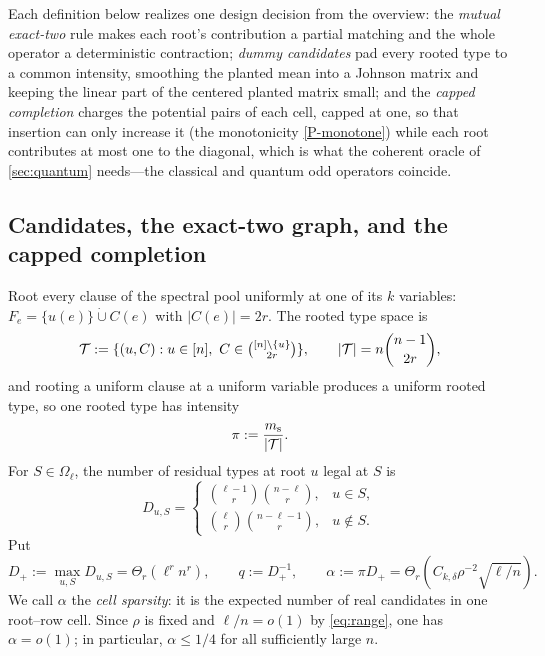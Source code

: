 \documentclass[11pt]{article}
\theoremstyle{definition}
\theoremstyle{remark}
\newcommand{\1}{\mathbf 1}
\newcommand{\cT}{\mathcal T}
\numberwithin{equation}{section}
\begin{document}
Each definition below realizes one design decision from the overview:
the \emph{mutual exact-two} rule makes each root's contribution a
partial matching and the whole operator a deterministic contraction;
\emph{dummy candidates} pad every rooted type to a common intensity,
smoothing the planted mean into a Johnson matrix and keeping the linear
part of the centered planted matrix small; and the \emph{capped
completion} charges the potential pairs of each cell, capped at one, so
that insertion can only increase it (the monotonicity \ref{P-monotone})
while each root contributes at most one to the diagonal, which is what
the coherent oracle of \cref{sec:quantum} needs---the classical and
quantum odd operators coincide.

\subsection{Candidates, the exact-two graph, and the capped completion}
\label{sec:odd-construction}

Root every clause of the spectral pool uniformly at one of its $k$
variables: $F_e=\{u(e)\}\mathbin{\dot\cup}C(e)$ with $|C(e)|=2r$.  The
rooted type space is
\[
 \cT:=\{(u,C):u\in[n],\ C\in\tbinom{[n]\setminus\{u\}}{2r}\},
 \qquad |\cT|=n\binom{n-1}{2r},
\]
and rooting a uniform clause at a uniform variable produces a uniform
rooted type, so one rooted type has intensity
\begin{equation}\label{eq:odd-pi}
 \pi:=\frac{m_{\rm s}}{|\cT|}.
\end{equation}
For $S\in\Omega_\ell$, the number of residual types at root $u$ legal at
$S$ is
\begin{equation}\label{eq:odd-cell}
 D_{u,S}=
 \begin{cases}
 \binom{\ell-1}r\binom{n-\ell}r,&u\in S,\\[1mm]
 \binom\ell r\binom{n-\ell-1}r,&u\notin S.
 \end{cases}
\end{equation}
Put
\begin{equation}\label{eq:odd-alpha}
 D_+:=\max_{u,S}D_{u,S}=\Theta_r(\ell^rn^r),
 \qquad q:=D_+^{-1},
 \qquad \alpha:=\pi D_+
 =\Theta_r\!\left(C_{k,\delta}\rho^{-2}\sqrt{\ell/n}\right).
\end{equation}
We call $\alpha$ the \emph{cell sparsity}: it is the expected number of
real candidates in one root--row cell.  Since $\rho$ is fixed and
$\ell/n=o(1)$ by \cref{eq:range}, one has $\alpha=o(1)$; in particular,
$\alpha\le1/4$ for all sufficiently large $n$.
\end{document}
